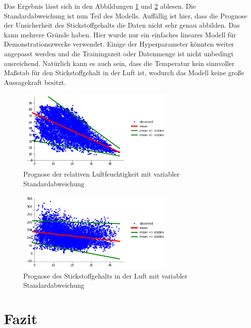 \documentclass[12pt]{article}
\begin{document}
Das Ergebnis lässt sich in den Abbildungen \ref{fig:with_unc_rh} und \ref{fig:with_unc_no2} ablesen. Die Standardabweichung ist nun Teil des Modells. Auffällig ist hier, dass die Prognose der Unsicherheit des Stickstoffgehalts die Daten nicht sehr genau abbilden. Das kann mehrere Gründe haben. Hier wurde nur ein einfaches lineares Modell für Demonstrationszwecke verwendet. Einige der Hyperparameter könnten weiter angepasst werden und die Trainingszeit oder Datenmenge ist nicht unbedingt ausreichend. Natürlich kann es auch sein, dass die Temperatur kein sinnvoller Maßstab für den Stickstoffgehalt in der Luft ist, wodurch das Modell keine große Aussagekraft besitzt. 

\begin{figure}[h]
    \centering
    \includegraphics[width=0.7\textwidth]{./figs/with_unc_rh.png}
    \caption{Prognose der relativen Luftfeuchtigkeit mit variabler Standardabweichung}
    \label{fig:with_unc_rh}
\end{figure}

\begin{figure}[h]
    \centering
    \includegraphics[width=0.7\textwidth]{./figs/with_unc_no2.png}
    \caption{Prognose des Stickstoffgehalts in der Luft mit variabler Standardabweichung}
    \label{fig:with_unc_no2}
\end{figure}


\section{Fazit}
\end{document}
